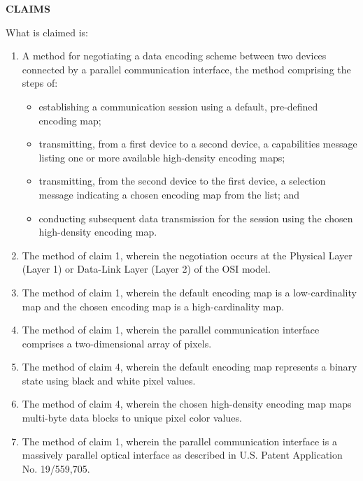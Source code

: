 \documentclass[11pt,letterpaper]{article}
\begin{document}
\thispagestyle{empty}

\begin{center}
    \textbf{\large CLAIMS}
\end{center}

\vspace{0.4cm}
\noindent What is claimed is:

\begin{enumerate}[label=\textbf{\arabic*.}, leftmargin=0.5in, itemsep=0.4cm]
    \item A method for negotiating a data encoding scheme between two devices connected by a parallel communication interface, the method comprising the steps of:
    \begin{itemize}[leftmargin=0.3in, noitemsep]
        \item establishing a communication session using a default, pre-defined encoding map;
        \item transmitting, from a first device to a second device, a capabilities message listing one or more available high-density encoding maps;
        \item transmitting, from the second device to the first device, a selection message indicating a chosen encoding map from the list; and
        \item conducting subsequent data transmission for the session using the chosen high-density encoding map.
    \end{itemize}

    \item The method of claim 1, wherein the negotiation occurs at the Physical Layer (Layer 1) or Data-Link Layer (Layer 2) of the OSI model.

    \item The method of claim 1, wherein the default encoding map is a low-cardinality map and the chosen encoding map is a high-cardinality map.

    \item The method of claim 1, wherein the parallel communication interface comprises a two-dimensional array of pixels.

    \item The method of claim 4, wherein the default encoding map represents a binary state using black and white pixel values.

    \item The method of claim 4, wherein the chosen high-density encoding map maps multi-byte data blocks to unique pixel color values.

    \item The method of claim 1, wherein the parallel communication interface is a massively parallel optical interface as described in U.S. Patent Application No. 19/559,705.
\end{enumerate}
\end{document}
